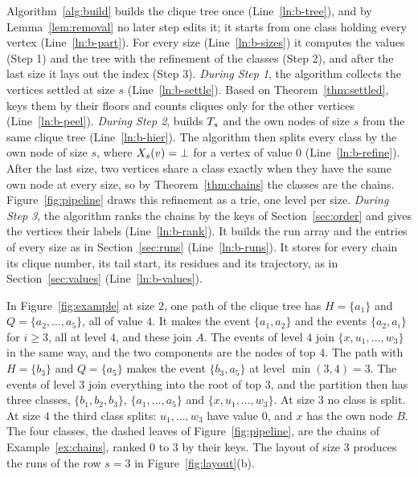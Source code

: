 Algorithm~\ref{alg:build} builds the clique tree once (Line~\ref{ln:b-tree}), and by Lemma~\ref{lem:removal} no later step edits it; it starts from one class holding every vertex (Line~\ref{ln:b-part}).
%
For every size (Line~\ref{ln:b-sizes}) it computes the values (Step 1) and the tree with the refinement of the classes (Step 2), and after the last size it lays out the index (Step 3).
%
\emph{During Step 1}, the algorithm collects the vertices settled at size $s$ (Line~\ref{ln:b-settle}).
%
Based on Theorem~\ref{thm:settled},  keys them by their floors and counts cliques only for the other vertices (Line~\ref{ln:b-peel}).
%
\emph{During Step 2},  builds $T_{s}$ and the own nodes of size $s$ from the same clique tree (Line~\ref{ln:b-hier}).
%
The algorithm then splits every class by the own node of size $s$, where $X_{s}(v)=\bot$ for a vertex of value $0$ (Line~\ref{ln:b-refine}).
%
After the last size, two vertices share a class exactly when they have the same own node at every size, so by Theorem~\ref{thm:chains} the classes are the chains.
%
Figure~\ref{fig:pipeline} draws this refinement as a trie, one level per size.
%
\emph{During Step 3}, the algorithm ranks the chains by the keys of Section~\ref{sec:order} and gives the vertices their labels (Line~\ref{ln:b-rank}).
%
It builds the run array and the entries of every size as in Section~\ref{sec:runs} (Line~\ref{ln:b-runs}).
%
It stores for every chain its clique number, its tail start, its residues and its trajectory, as in Section~\ref{sec:values} (Line~\ref{ln:b-values}).

\begin{example}\label{ex:build}
In Figure~\ref{fig:example} at size $2$, one path of the clique tree has $H=\{a_1\}$ and $Q=\{a_2,\dots,a_5\}$, all of value $4$.
%
It makes the event $\{a_1,a_2\}$ and the events $\{a_2,a_i\}$ for $i\ge3$, all at level $4$, and these join $A$.
%
The events of level $4$ join $\{x,u_1,\dots,w_3\}$ in the same way, and the two components are the nodes of top $4$.
%
The path with $H=\{b_3\}$ and $Q=\{a_5\}$ makes the event $\{b_3,a_5\}$ at level $\min(3,4)=3$.
%
The events of level $3$ join everything into the root of top $3$, and the partition then has three classes, $\{b_1,b_2,b_3\}$, $\{a_1,\dots,a_5\}$ and $\{x,u_1,\dots,w_3\}$.
%
At size $3$ no class is split.
%
At size $4$ the third class splits: $u_1,\dots,w_3$ have value $0$, and $x$ has the own node $B$.
%
The four classes, the dashed leaves of Figure~\ref{fig:pipeline}, are the chains of Example~\ref{ex:chains}, ranked $0$ to $3$ by their keys.
%
The layout of size $3$ produces the runs of the row $s=3$ in Figure~\ref{fig:layout}(b).
\end{example}

